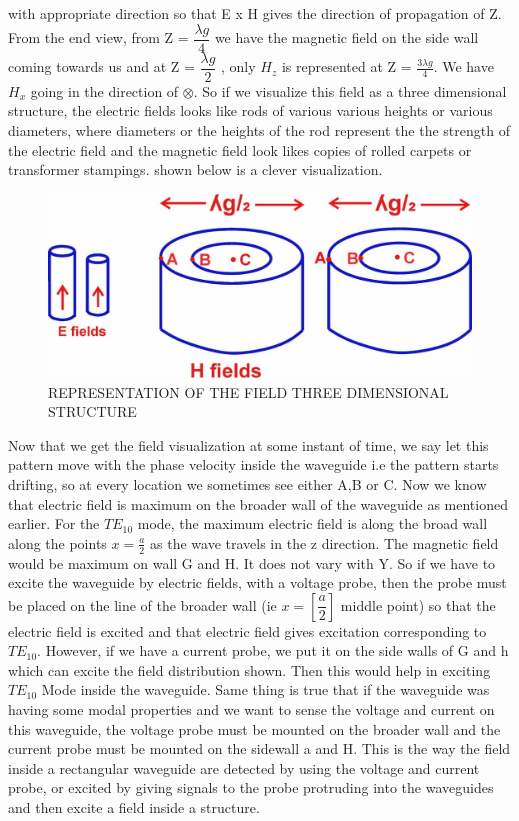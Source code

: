 with appropriate direction so that E x H gives the direction of propagation of Z. From the end view, from Z = $\dfrac{\lambda g}{4}$ we have the magnetic field on the side wall coming towards us and at Z = $\dfrac{\lambda g}{2}$ , only $H_{z}$ is represented at 
Z = $\frac{3\lambda g}{4}$. We have $H_{x}$ going in the direction of $\otimes$. So if we visualize this field as a three dimensional structure, the electric fields looks like rods of various various heights or various diameters, where diameters or the heights of the
rod represent the the strength of the electric field and the magnetic field look likes copies of rolled carpets or transformer stampings. shown below is a clever visualization.
\begin{figure}[h]
\centering
\includegraphics[width=1\linewidth]{./graphics/lecture-image-4.jpg}
\caption{REPRESENTATION OF THE FIELD THREE DIMENSIONAL STRUCTURE}
\end{figure}
	
Now that we get the field visualization at some instant of time, we say let this pattern move with the phase velocity inside the waveguide i.e the pattern starts drifting, so at every location we sometimes see either A,B or C. Now we know that electric field is maximum on the broader wall of the waveguide as mentioned earlier. For the $TE_{10}$ mode, the maximum electric field is along the broad wall along the points   $x = \frac{a}{2}$ as the wave travels in the z direction. The magnetic field would be maximum on wall G and H. It does not vary with Y. So if we have to excite the waveguide by electric fields, with a voltage probe, then the probe must be placed on the line of the broader wall (ie $x = [\dfrac{a}{2}]$ middle point) so that the electric field is excited and that electric field gives excitation corresponding to $TE_{10}$. However, if we have a current probe, we put it on the side walls of G and h which can excite the field distribution shown. Then this would help in exciting $TE_{10}$ Mode inside the waveguide. Same thing is true that if the waveguide was having some modal properties and we want to sense the voltage and current on this waveguide, the voltage probe must be mounted on the broader wall and the current probe must be mounted on the sidewall a and H. This is the way the field inside a rectangular waveguide are detected by using the voltage and current probe, or excited by giving signals to the probe protruding into the waveguides and then excite a field inside a structure.

